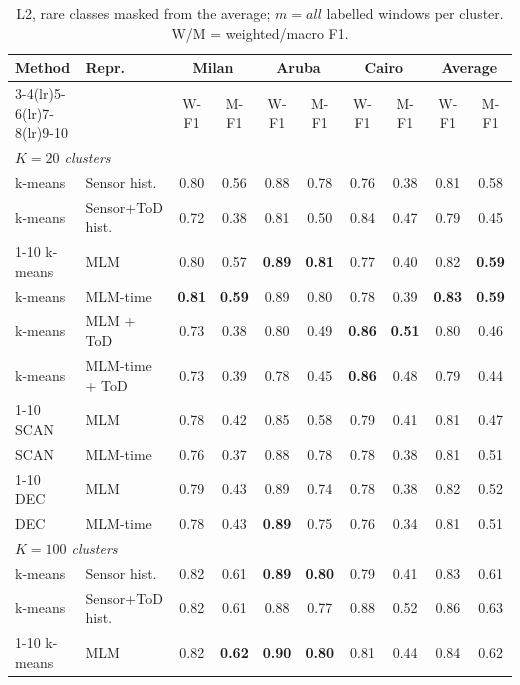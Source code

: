 \begin{table}[t]
\centering\small
\caption{L2, rare classes masked from the average; $m=all$ labelled windows per cluster. W/M = weighted/macro F1.}
\label{tab:l2_masked_mall}
\setlength{\tabcolsep}{4pt}
\begin{tabular}{llcccccc|cc}
\toprule
Method & Repr. & \multicolumn{2}{c}{Milan} & \multicolumn{2}{c}{Aruba} & \multicolumn{2}{c}{Cairo} & \multicolumn{2}{c}{Average} \\
\cmidrule(lr){3-4}\cmidrule(lr){5-6}\cmidrule(lr){7-8}\cmidrule(lr){9-10}
 & & W-F1 & M-F1 & W-F1 & M-F1 & W-F1 & M-F1 & W-F1 & M-F1 \\
\midrule
\multicolumn{10}{l}{\textit{$K = 20$ clusters}} \\
\midrule
k-means & Sensor hist. & 0.80 & 0.56 & 0.88 & 0.78 & 0.76 & 0.38 & 0.81 & 0.58 \\
k-means & Sensor+ToD hist. & 0.72 & 0.38 & 0.81 & 0.50 & 0.84 & 0.47 & 0.79 & 0.45 \\
\cmidrule{1-10}
k-means & MLM & 0.80 & 0.57 & \textbf{0.89} & \textbf{0.81} & 0.77 & 0.40 & 0.82 & \textbf{0.59} \\
k-means & MLM-time & \textbf{0.81} & \textbf{0.59} & 0.89 & 0.80 & 0.78 & 0.39 & \textbf{0.83} & \textbf{0.59} \\
k-means & MLM + ToD & 0.73 & 0.38 & 0.80 & 0.49 & \textbf{0.86} & \textbf{0.51} & 0.80 & 0.46 \\
k-means & MLM-time + ToD & 0.73 & 0.39 & 0.78 & 0.45 & \textbf{0.86} & 0.48 & 0.79 & 0.44 \\
\cmidrule{1-10}
SCAN & MLM & 0.78 & 0.42 & 0.85 & 0.58 & 0.79 & 0.41 & 0.81 & 0.47 \\
SCAN & MLM-time & 0.76 & 0.37 & 0.88 & 0.78 & 0.78 & 0.38 & 0.81 & 0.51 \\
\cmidrule{1-10}
DEC & MLM & 0.79 & 0.43 & 0.89 & 0.74 & 0.78 & 0.38 & 0.82 & 0.52 \\
DEC & MLM-time & 0.78 & 0.43 & \textbf{0.89} & 0.75 & 0.76 & 0.34 & 0.81 & 0.51 \\
\midrule
\multicolumn{10}{l}{\textit{$K = 100$ clusters}} \\
\midrule
k-means & Sensor hist. & 0.82 & 0.61 & \textbf{0.89} & \textbf{0.80} & 0.79 & 0.41 & 0.83 & 0.61 \\
k-means & Sensor+ToD hist. & 0.82 & 0.61 & 0.88 & 0.77 & 0.88 & 0.52 & 0.86 & 0.63 \\
\cmidrule{1-10}
k-means & MLM & 0.82 & \textbf{0.62} & \textbf{0.90} & \textbf{0.80} & 0.81 & 0.44 & 0.84 & 0.62 \\

\end{tabular}
\end{table}
